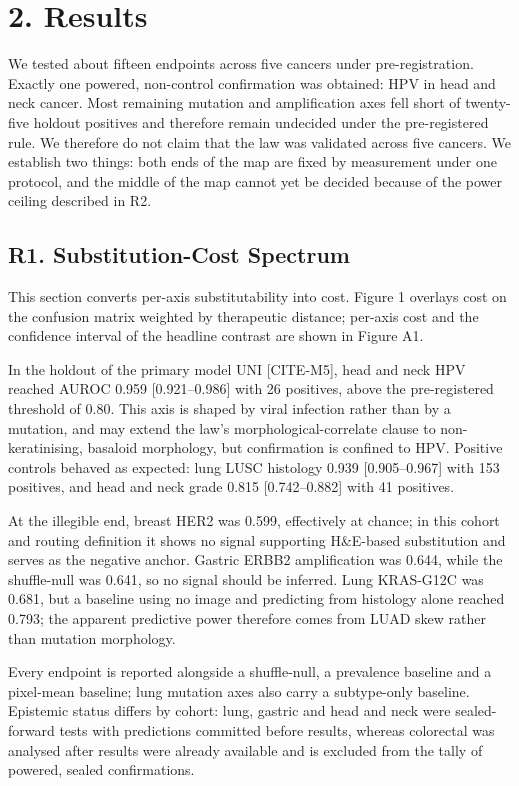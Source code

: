 \section*{2. Results}

We tested about fifteen endpoints across five cancers under pre-registration. Exactly one powered, non-control confirmation was obtained: HPV in head and neck cancer. Most remaining mutation and amplification axes fell short of twenty-five holdout positives and therefore remain undecided under the pre-registered rule. We therefore do not claim that the law was validated across five cancers. We establish two things: both ends of the map are fixed by measurement under one protocol, and the middle of the map cannot yet be decided because of the power ceiling described in R2.

\subsection*{R1. Substitution-Cost Spectrum}

This section converts per-axis substitutability into cost. Figure 1 overlays cost on the confusion matrix weighted by therapeutic distance; per-axis cost and the confidence interval of the headline contrast are shown in Figure A1.

In the holdout of the primary model UNI [CITE-M5], head and neck HPV reached AUROC 0.959 [0.921--0.986] with 26 positives, above the pre-registered threshold of 0.80. This axis is shaped by viral infection rather than by a mutation, and may extend the law's morphological-correlate clause to non-keratinising, basaloid morphology, but confirmation is confined to HPV. Positive controls behaved as expected: lung LUSC histology 0.939 [0.905--0.967] with 153 positives, and head and neck grade 0.815 [0.742--0.882] with 41 positives.

At the illegible end, breast HER2 was 0.599, effectively at chance; in this cohort and routing definition it shows no signal supporting H\&E-based substitution and serves as the negative anchor. Gastric ERBB2 amplification was 0.644, while the shuffle-null was 0.641, so no signal should be inferred. Lung KRAS-G12C was 0.681, but a baseline using no image and predicting from histology alone reached 0.793; the apparent predictive power therefore comes from LUAD skew rather than mutation morphology.

Every endpoint is reported alongside a shuffle-null, a prevalence baseline and a pixel-mean baseline; lung mutation axes also carry a subtype-only baseline. Epistemic status differs by cohort: lung, gastric and head and neck were sealed-forward tests with predictions committed before results, whereas colorectal was analysed after results were already available and is excluded from the tally of powered, sealed confirmations.

